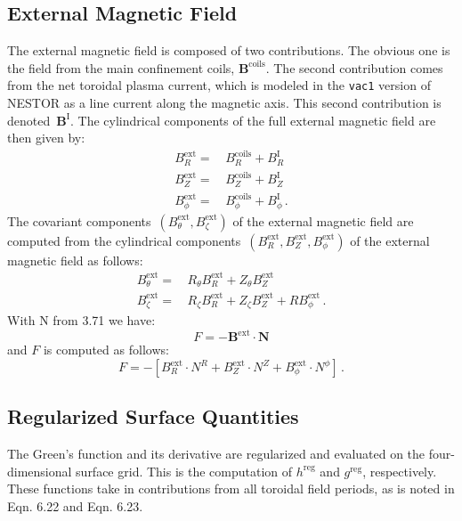 \subsection{External Magnetic Field}
The external magnetic field is composed of two contributions.
The obvious one is the field from the main confinement coils, $\mathbf{B}^\textrm{coils}$.
The second contribution comes from the net toroidal plasma current,
which is modeled in the \texttt{vac1} version of NESTOR as a line current along the magnetic axis.
This second contribution is denoted~$\mathbf{B}^\textrm{I}$.
The cylindrical components of the full external magnetic field are then given by:
\begin{align}
  B^\textrm{ext}_R       =&\, B^\textrm{coils}_R       + B^\textrm{I}_R       \\
  B^\textrm{ext}_Z       =&\, B^\textrm{coils}_Z       + B^\textrm{I}_Z       \\
  B^\textrm{ext}_\phi =&\, B^\textrm{coils}_\phi + B^\textrm{I}_\phi \, .
\end{align}
The covariant components~$(B^\textrm{ext}_\theta, B^\textrm{ext}_\zeta)$ of the external magnetic field
are computed from the cylindrical components~$(B^\textrm{ext}_R, B^\textrm{ext}_Z, B^\textrm{ext}_\phi)$
of the external magnetic field as follows:
\begin{align}
 B^{\textrm{ext}}_\theta =&\, R_\theta B^\textrm{ext}_R + Z_\theta B^\textrm{ext}_Z \\
 B^{\textrm{ext}}_\zeta  =&\, R_\zeta  B^\textrm{ext}_R + Z_\zeta  B^\textrm{ext}_Z + R B^\textrm{ext}_\phi \, .
\end{align}
With N from 3.71 we have: %
\begin{equation}
 F = - \mathbf{B}^\textrm{ext} \cdot \mathbf{N}
\end{equation}
and $F$ is computed as follows:
\begin{equation}
 F = - \left[
     B^\textrm{ext}_R       \cdot N^R
   + B^\textrm{ext}_Z       \cdot N^Z
   + B^\textrm{ext}_\phi \cdot N^\phi
 \right] \, .
\end{equation}

\FloatBarrier
\subsection{Regularized Surface Quantities}
The Green's function and its derivative are regularized
and evaluated on the four-dimensional surface grid.
This is the computation of $h^\textrm{reg}$ and $g^\textrm{reg}$, respectively.
These functions take in contributions from all toroidal field periods,
as is noted in Eqn. 6.22 and Eqn. 6.23. %

